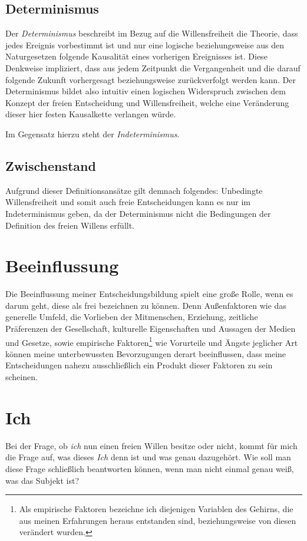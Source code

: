 \documentclass[a4paper, 12pt]{article}
\begin{document}
\subsection{Determinismus}
Der \textit{Determinismus} beschreibt im Bezug auf die Willensfreiheit die Theorie, dass jedes Ereignis vorbestimmt ist und nur eine logische beziehungsweise aus den Naturgesetzen folgende Kausalität eines vorherigen Ereignisses ist. Diese Denkweise impliziert, dass aus jedem Zeitpunkt die Vergangenheit und die darauf folgende Zukunft vorhergesagt beziehungsweise zurückverfolgt werden kann. Der Determinismus bildet also intuitiv einen logischen Widerspruch zwischen dem Konzept der freien Entscheidung und Willensfreiheit, welche eine Veränderung dieser hier festen Kausalkette verlangen würde.

Im Gegensatz hierzu steht der \textit{Indeterminismus}.

\subsection{Zwischenstand}
Aufgrund dieser Definitionsansätze gilt demnach folgendes: Unbedingte Willensfreiheit und somit auch freie Entscheidungen kann es nur im Indeterminismus geben, da der Determinismus nicht die Bedingungen der Definition des freien Willens erfüllt.

\section{Beeinflussung}
Die Beeinflussung meiner Entscheidungsbildung spielt eine große Rolle, wenn es darum geht, diese als frei bezeichnen zu können. Denn Außenfaktoren wie das generelle Umfeld, die Vorlieben der Mitmenschen, Erziehung, zeitliche Präferenzen der Gesellschaft, kulturelle Eigenschaften und Aussagen der Medien und Gesetze, sowie empirische Faktoren\footnote{Als empirische Faktoren bezeichne ich diejenigen Variablen des Gehirns, die aus meinen Erfahrungen heraus entstanden sind, beziehungsweise von diesen verändert wurden.} wie Vorurteile und Ängste jeglicher Art können meine unterbewussten Bevorzugungen derart beeinflussen, dass meine Entscheidungen nahezu ausschließlich ein Produkt dieser Faktoren zu sein scheinen.

\section{Ich}
Bei der Frage, ob \textit{ich} nun einen freien Willen besitze oder nicht, kommt für mich die Frage auf, was dieses \textit{Ich} denn ist und was genau dazugehört. Wie soll man diese Frage schließlich beantworten können, wenn man nicht einmal genau weiß, was das Subjekt ist?
\end{document}
